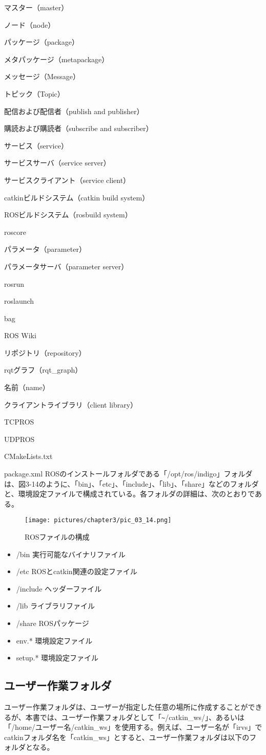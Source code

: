 \begin{term}{マスター（master）}
\begin{term}{ノード（node）}
\begin{term}{パッケージ（package）}
\begin{term}{メタパッケージ（metapackage）}
\begin{term}{メッセージ（Message）}
\begin{term}{トピック（Topic）}
\begin{term}{配信および配信者（publish and publisher）}
\begin{term}{購読および購読者（subscribe and subscriber）}
\begin{term}{サービス（service）}
\begin{term}{サービスサーバ（service server）}
\begin{term}{サービスクライアント（service client）}
\begin{term}{catkinビルドシステム（catkin build system）}
\begin{term}{ROSビルドシステム（rosbuild system）}
\begin{term}{roscore}
\begin{term}{パラメータ（parameter）}
\begin{term}{パラメータサーバ（parameter server）}
\begin{term}{rosrun}
\begin{term}{roslaunch}
\begin{term}{bag}
\begin{term}{ROS Wiki}
\begin{term}{リポジトリ（repository）}
\begin{term}{rqtグラフ（rqt\_graph）}
\begin{term}{名前（name）}
\begin{term}{クライアントライブラリ（client library）}
\begin{term}{TCPROS}
\begin{term}{UDPROS}
\begin{term}{CMakeLists.txt}
\begin{term}{package.xml}
ROSのインストールフォルダである「/opt/ros/indigo」フォルダは、図3-14のように、「bin」、「etc」、「include」、「lib」、「share」などのフォルダと、環境設定ファイルで構成されている。各フォルダの詳細は、次のとおりである。

\begin{figure}[h]
  \centering
  \texttt{[image: pictures/chapter3/pic\_03\_14.png]}
  \caption{ROSファイルの構成}
\end{figure}

\vspace{\baselineskip}
\begin{itemize}
\item /bin    実行可能なバイナリファイル
\item /etc    ROSとcatkin関連の設定ファイル
\item /include  ヘッダーファイル
\item /lib    ライブラリファイル
\item /share  ROSパッケージ
\item env.*   環境設定ファイル
\item setup.* 環境設定ファイル
\end{itemize}
\vspace{\baselineskip}

\subsection{ユーザー作業フォルダ}

ユーザー作業フォルダは、ユーザーが指定した任意の場所に作成することができるが、本書では、ユーザー作業フォルダとして「\verb|~|/catkin\_ws/」、あるいは「/home/ユーザー名/catkin\_ws」を使用する。例えば、ユーザー名が「irvs」でcatkinフォルダ名を「catkin\_ws」とすると、ユーザー作業フォルダは以下のフォルダとなる。


\end{term}
\end{term}
\end{term}
\end{term}
\end{term}
\end{term}
\end{term}
\end{term}
\end{term}
\end{term}
\end{term}
\end{term}
\end{term}
\end{term}
\end{term}
\end{term}
\end{term}
\end{term}
\end{term}
\end{term}
\end{term}
\end{term}
\end{term}
\end{term}
\end{term}
\end{term}
\end{term}
\end{term}
